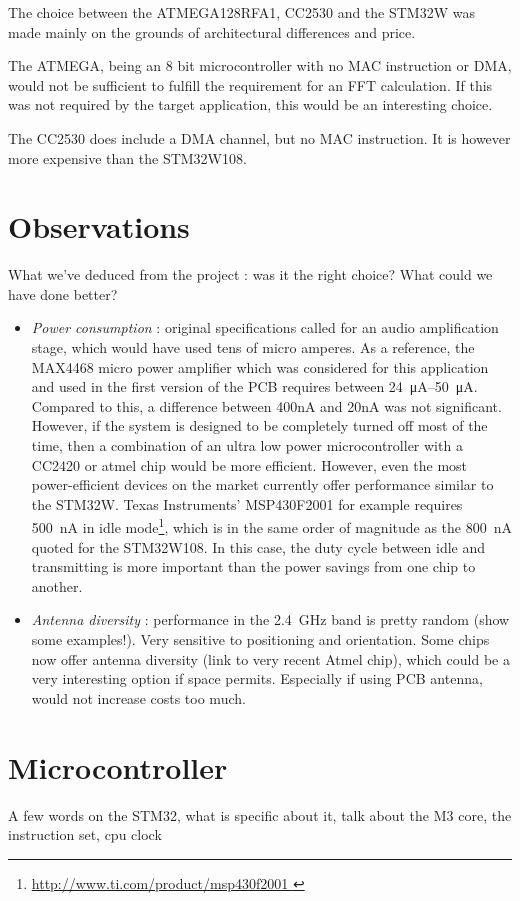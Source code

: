 The choice between the ATMEGA128RFA1, CC2530 and the STM32W was made mainly on
the grounds of architectural differences and price.

The ATMEGA, being an 8 bit microcontroller with no MAC instruction or DMA, would
not be sufficient to fulfill the requirement for an FFT calculation. If this was
not required by the target application, this would be an interesting choice.

The CC2530 does include a DMA channel, but no MAC instruction. It is however
more expensive than the STM32W108. 

\section{Observations}

What we've deduced from the project : was it the right choice? What could we
have done better?

\begin{itemize}
  \item \emph{Power consumption} : original specifications called for an audio
    amplification stage, which would have used tens of micro amperes. As
    a reference, the MAX4468 micro power amplifier which was considered for this
    application and used in the first version of the PCB requires between
    \SIrange{24}{50}{\micro\ampere}. Compared to this, a difference between
    400nA and 20nA was not significant. However, if the system is designed to be
    completely turned off most of the time, then a combination of an ultra low
    power microcontroller with a CC2420 or atmel chip would be more efficient.
    However, even the most power-efficient devices on the market currently offer
    performance similar to the STM32W. Texas Instruments' MSP430F2001 for
    example requires \SI{500}{nA} in idle mode\footnote{ \url{
    http://www.ti.com/product/msp430f2001 }}, which is in the same order of
    magnitude as the \SI{800}{nA} quoted for the STM32W108. In this case, the
    duty cycle between idle and transmitting is more important than the power
    savings from one chip to another.
  \item \emph{Antenna diversity} : performance in the \SI{2.4}{GHz} band is pretty
    random (show some examples!). Very sensitive to positioning and orientation.
    Some chips now offer antenna diversity (link to very recent Atmel chip),
    which could be a very interesting option if space permits. Especially if
    using PCB antenna, would not increase costs too much.
\end{itemize}


\section{Microcontroller}

A few words on the STM32, what is specific about it, talk about the M3 core, the
instruction set, cpu clock
